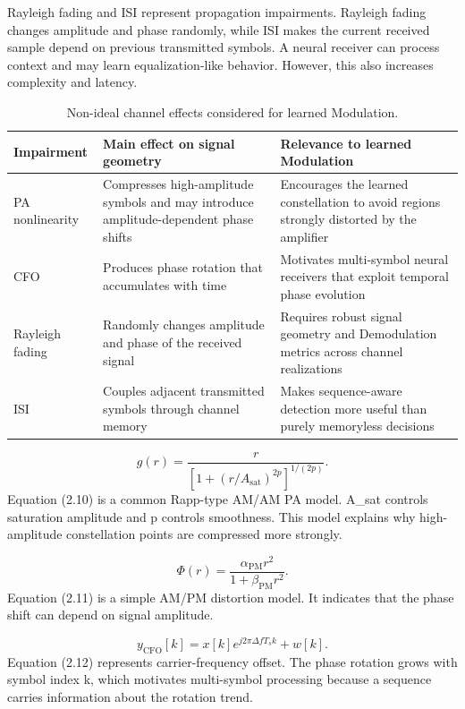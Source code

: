 Rayleigh fading and ISI represent propagation impairments. Rayleigh fading changes amplitude and phase randomly, while ISI makes the current received sample depend on previous transmitted symbols. A neural receiver can process context and may learn equalization-like behavior. However, this also increases complexity and latency.

\begin{table}[H]
\centering
\caption{Non-ideal channel effects considered for learned Modulation.}
\label{tab:learned_modulation_impairments}
\begin{tabularx}{\textwidth}{p{}p{}Y}
\toprule
Impairment & Main effect on signal geometry & Relevance to learned Modulation\\
\midrule
PA nonlinearity & Compresses high-amplitude symbols and may introduce amplitude-dependent phase shifts & Encourages the learned constellation to avoid regions strongly distorted by the amplifier\\
CFO & Produces phase rotation that accumulates with time & Motivates multi-symbol neural receivers that exploit temporal phase evolution\\
Rayleigh fading & Randomly changes amplitude and phase of the received signal & Requires robust signal geometry and Demodulation metrics across channel realizations\\
ISI & Couples adjacent transmitted symbols through channel memory & Makes sequence-aware detection more useful than purely memoryless decisions\\
\bottomrule
\end{tabularx}
\end{table}

\begin{equation}
g(r)=\frac{r}{\left[1+\left(r/A_{\mathrm{sat}}\right)^{2p}\right]^{1/(2p)}}.
\end{equation}
Equation (2.10) is a common Rapp-type AM/AM PA model. A\_sat controls saturation amplitude and p controls smoothness. This model explains why high-amplitude constellation points are compressed more strongly.

\begin{equation}
\Phi(r)=\frac{\alpha_{\mathrm{PM}}r^2}{1+\beta_{\mathrm{PM}}r^2}.
\end{equation}
Equation (2.11) is a simple AM/PM distortion model. It indicates that the phase shift can depend on signal amplitude.

\begin{equation}
y_{\mathrm{CFO}}[k]=x[k]e^{j2\pi \Delta f T_s k}+w[k].
\end{equation}
Equation (2.12) represents carrier-frequency offset. The phase rotation grows with symbol index k, which motivates multi-symbol processing because a sequence carries information about the rotation trend.

